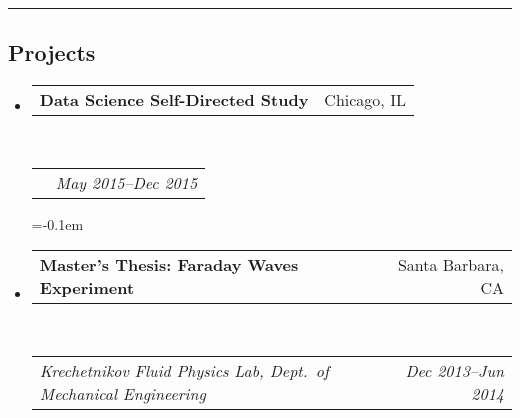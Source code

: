\documentclass[10pt,letterpaper]{article}
\makeatletter
\newcommand{\headerrow}[2]
{\begin{tabular*}{\linewidth}{l@{\extracolsep{\fill}}r}
	#1 &
	#2 \\
\end{tabular*}}
\makeatother
\begin{document}
\hrule
\vspace{-0.4em}
\subsection*{Projects}

\begin{itemize}
	\parskip=-0.1em
	\item
	\headerrow
		{\textbf{Data Science Self-Directed Study}}
		{Chicago, IL}	\\
	\headerrow
		{}
		{\emph{May 2015--Dec 2015}}

	\parskip=-0.1em
	\item
	\headerrow
		{\textbf{Master's Thesis: Faraday Waves Experiment}}
		{Santa Barbara, CA}	\\
	\headerrow
		{\emph{Krechetnikov Fluid Physics Lab, Dept.\ of Mechanical Engineering}}
		{\emph{Dec 2013--Jun 2014}}
\end{itemize}
\end{document}
